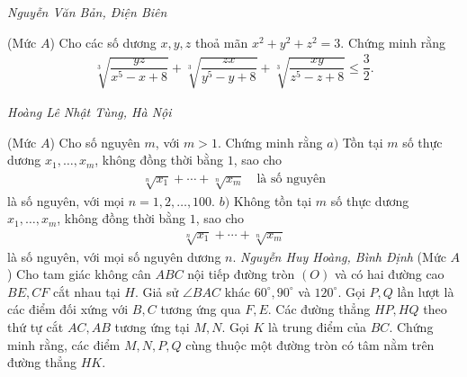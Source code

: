 \begin{multicols}{2}
\begin{figure}[H]
		\vspace*{-10pt}
	\end{figure}
	\begin{flushright}
		\textit{\small Nguyễn Văn Bản, Điện Biên}
	\end{flushright}
	{\color{thachthuctoanhoc}{\usefont{T5}{qag}{b}{n} P697.}}
	(Mức $A$) Cho các số dương $x,y,z$ thoả mãn $x^2+y^2+z^2=3$. Chứng minh rằng
	\begin{align*}
		\sqrt[3]{\dfrac{y z}{x^5\!-\!x\!+\!8}}\!+\!\sqrt[3]{\dfrac{z x}{y^5\!-\!y\!+\!8}}\!+\!\sqrt[3]{\dfrac{x y}{z^5\!-\!z\!+\!8}} \!\le\! \dfrac{3}{2}.
	\end{align*}
	\begin{flushright}
		\textit{Hoàng Lê Nhật Tùng, Hà Nội}
	\end{flushright}
	{}
	(Mức $A$) Cho số nguyên $m$, với $m>1$. Chứng minh rằng
	\vskip 0.05cm
	$a)$ Tồn tại $m$ số thực dương $x_1,\ldots,x_m$, không đồng thời bằng $1$, sao cho
	\begin{align*}
		\sqrt[n]{x_1}+\cdots+\sqrt[n]{x_m}\quad\text{là số nguyên}
	\end{align*}
	là số nguyên, với mọi $n=1,2,\ldots,100$.
	\vskip 0.05cm
	$b)$ Không tồn  tại $m$ số thực dương $x_1,\ldots,x_m$, không đồng thời bằng $1$, sao cho
	\begin{align*}
		\sqrt[n]{x_1}+\cdots+\sqrt[n]{x_m}
	\end{align*}
	là số nguyên, với mọi số nguyên dương $n$.
	\vskip 0.05cm
	\hfill	\textit{\small Nguyễn Huy Hoàng, Bình Định}
	\vskip 0.05cm
	\columnbreak
	{}
	(Mức $A$) Cho tam giác không cân $ABC$ nội tiếp đường tròn $(O)$ và có hai đường cao $BE,CF$ cắt nhau tại $H$. Giả sử   $\angle BAC$ khác $60^\circ,90^\circ$ và $120^\circ$.  Gọi $P, Q$ lần lượt là các điểm đối xứng với $B,C $ tương ứng qua $F, E$. Các đường thẳng $HP, HQ$ theo thứ tự cắt $AC, AB$ tương ứng tại $M, N$.  Gọi $K$ là trung điểm của $BC$. Chứng minh rằng, các điểm $M, N, P, Q$ cùng thuộc một đường tròn có tâm nằm trên đường thẳng $HK$.

\end{multicols}
